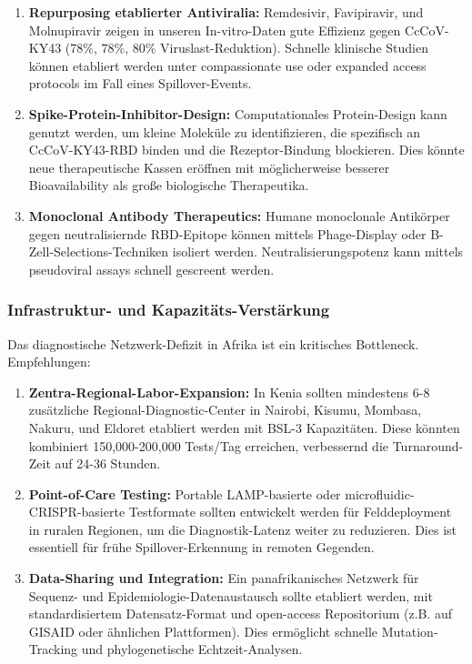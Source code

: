 \documentclass[11pt,a4paper]{article}
\theoremstyle{definition}
\begin{document}
\begin{enumerate}
\item \textbf{Repurposing etablierter Antiviralia:} Remdesivir, Favipiravir, und Molnupiravir zeigen in unseren In-vitro-Daten gute Effizienz gegen CcCoV-KY43 (78\%, 78\%, 80\% Viruslast-Reduktion). Schnelle klinische Studien können etabliert werden unter compassionate use oder expanded access protocols im Fall eines Spillover-Events.

\item \textbf{Spike-Protein-Inhibitor-Design:} Computationales Protein-Design kann genutzt werden, um kleine Moleküle zu identifizieren, die spezifisch an CcCoV-KY43-RBD binden und die Rezeptor-Bindung blockieren. Dies könnte neue therapeutische Kassen eröffnen mit möglicherweise besserer Bioavailability als große biologische Therapeutika.

\item \textbf{Monoclonal Antibody Therapeutics:} Humane monoclonale Antikörper gegen neutralisiernde RBD-Epitope können mittels Phage-Display oder B-Zell-Selections-Techniken isoliert werden. Neutralisierungspotenz kann mittels pseudoviral assays schnell gescreent werden.
\end{enumerate}

\subsubsection{Infrastruktur- und Kapazitäts-Verstärkung}

Das diagnostische Netzwerk-Defizit in Afrika ist ein kritisches Bottleneck. Empfehlungen:

\begin{enumerate}
\item \textbf{Zentra-Regional-Labor-Expansion:} In Kenia sollten mindestens 6-8 zusätzliche Regional-Diagnostic-Center in Nairobi, Kisumu, Mombasa, Nakuru, und Eldoret etabliert werden mit BSL-3 Kapazitäten. Diese könnten kombiniert 150,000-200,000 Tests/Tag erreichen, verbessernd die Turnaround-Zeit auf 24-36 Stunden.

\item \textbf{Point-of-Care Testing:} Portable LAMP-basierte oder microfluidic-CRISPR-basierte Testformate sollten entwickelt werden für Felddeployment in ruralen Regionen, um die Diagnostik-Latenz weiter zu reduzieren. Dies ist essentiell für frühe Spillover-Erkennung in remoten Gegenden.

\item \textbf{Data-Sharing und Integration:} Ein panafrika­nisches Netzwerk für Sequenz- und Epidemio\-logie-Datenaustausch sollte etabliert werden, mit standardisiertem Datensatz-Format und open-access Repositorium (z.B. auf GISAID oder ähnlichen Plattformen). Dies ermöglicht schnelle Mutation-Tracking und phylogenetische Echtzeit-Analysen.
\end{enumerate}
\end{document}
